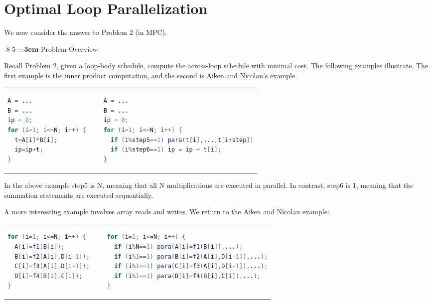 \documentclass[sigconf, screen, natbib=false, dvipsnames, table]{acmart}
\makeatletter
\renewcommand{\subsection}{\@startsection{subsection}{2}{\z@}%
                        {-8\p@ \@plus -4\p@ \@minus -4\p@}%
                        {5\p@ \@plus 2\p@ \@minus 2\p@}%
                        {\normalfont\Large\bfseries\boldmath
                         \rightskip=\z@ \@plus 3em\pretolerance=10000 }}
\theoremstyle{definition}
\makeatother
\begin{document}
\section{Optimal Loop Parallelization} 
\label{sec:optimal_loop_parallelization}
%


We now consider the answer to Problem 2 (in MPC). 

\subsection{Problem Overview} 

Recall Problem 2, given a loop-body schedule, compute the across-loop schedule
with minimal cost. The following examples illustrate. The first example is the inner 
product computation, and the second is Aiken and Nicolau's example.

\begin{tabular}{lll}
\begin{lstlisting}[language=Java]
A = ...
B = ...
ip = 0;
for (i=1; i<=N; i++) {
  t=A[i]*B[i];
  ip=ip+t;
}	

\end{lstlisting}
& 
~
&
\begin{lstlisting}[language=Java]
A = ...
B = ...
ip = 0;
for (i=1; i<=N; i++) {
  if (i%step5==1) para(t[i],...,t[i+step])
  if (i%step6==1) ip = ip + t[i];
}  
\end{lstlisting}

\end{tabular}


In the above example {\sf step5} is N, meaning that all N multiplications are executed in parallel.
In contrast, {\sf step6} is 1, meaning that the summation statements are executed sequentially.

A more interesting example involves array reads and writes. We return to the Aiken and Nicolau
example:

\begin{tabular}{lll}
\begin{lstlisting}[language=Java]
for (i=1; i<=N; i++) {
  A[i]=f1(B[i]);
  B[i]=f2(A[i],D[i-1]);
  C[i]=f3(A[i],D[i-1]);
  D[i]=f4(B[i],C[i]);
}	

\end{lstlisting}
& 
~
&
\begin{lstlisting}[language=Java]
for (i=1; i<=N; i++) {
  if (i%N==1) para(A[i]=f1(B[i]),...);
  if (i%1==1) para(B[i]=f2(A[i],D[i-1]),...);
  if (i%1==1) para(C[i]=f3(A[i],D[i-1]),...);
  if (i%1==1) para(D[i]=f4(B[i],C[i]),...);
}	
\end{lstlisting}

\end{tabular}
\end{document}
